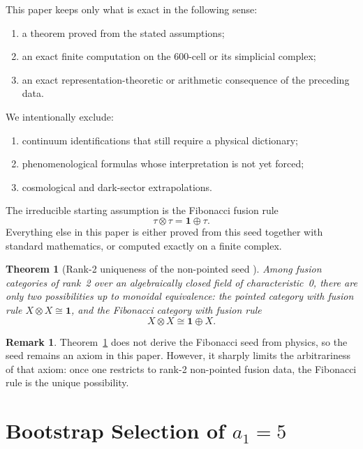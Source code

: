 \documentclass[12pt,a4paper]{article}
\newtheorem{theorem}{Theorem}
\theoremstyle{definition}
\newtheorem{remark}{Remark}
\begin{document}
This paper keeps only what is exact in the following sense:
\begin{enumerate}
\item a theorem proved from the stated assumptions;
\item an exact finite computation on the 600-cell or its simplicial complex;
\item an exact representation-theoretic or arithmetic consequence of the preceding data.
\end{enumerate}
We intentionally exclude:
\begin{enumerate}
\item continuum identifications that still require a physical dictionary;
\item phenomenological formulas whose interpretation is not yet forced;
\item cosmological and dark-sector extrapolations.
\end{enumerate}

The irreducible starting assumption is the Fibonacci fusion rule
\begin{equation}
\tau \otimes \tau = \mathbf{1} \oplus \tau.
\label{eq:fib_fusion}
\end{equation}
Everything else in this paper is either proved from this seed together with standard mathematics, or computed exactly on a finite complex.

\begin{theorem}[Rank-2 uniqueness of the non-pointed seed {\cite{ostrik2003}}]
\label{thm:rank2_unique}
Among fusion categories of rank~2 over an algebraically closed field of characteristic~0, there are only two possibilities up to monoidal equivalence: the pointed category with fusion rule $X\otimes X \cong \mathbf{1}$, and the Fibonacci category with fusion rule
\[
X\otimes X \cong \mathbf{1}\oplus X.
\]
\end{theorem}

\begin{remark}
Theorem~\ref{thm:rank2_unique} does not derive the Fibonacci seed from physics, so the seed remains an axiom in this paper.  However, it sharply limits the arbitrariness of that axiom: once one restricts to rank-2 non-pointed fusion data, the Fibonacci rule is the unique possibility.
\end{remark}

\section{Bootstrap Selection of \texorpdfstring{$a_1=5$}{a1=5}}
\end{document}
